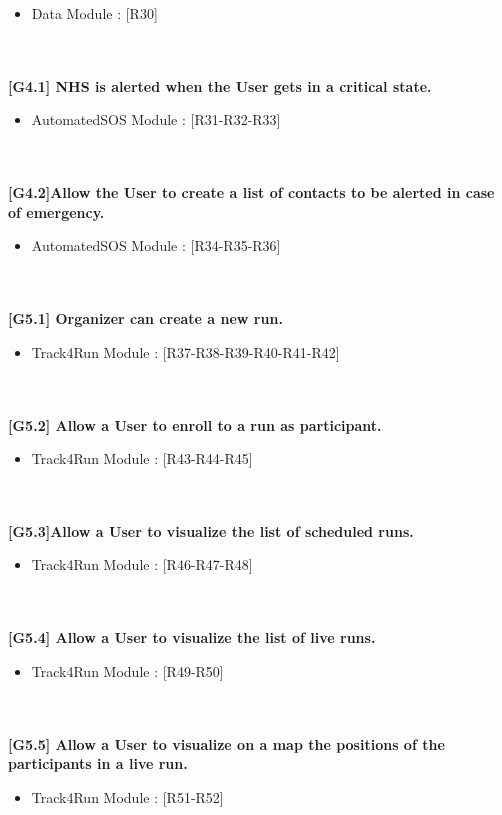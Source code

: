 \begin{itemize}
  \item Data Module : [R30]
\end{itemize} \\ \\
\textbf{[G4.1] NHS is alerted when the User gets in a critical state.}
\begin{itemize}
  \item AutomatedSOS Module : [R31-R32-R33]
\end{itemize} \\ \\
\textbf{[G4.2]Allow the User to create a list of contacts to be alerted in case of
emergency.}
\begin{itemize}
  \item AutomatedSOS Module : [R34-R35-R36]
\end{itemize} \\ \\
\textbf{[G5.1] Organizer can create a new run.}
\begin{itemize}
  \item Track4Run Module : [R37-R38-R39-R40-R41-R42]
\end{itemize} \\ \\
\textbf{[G5.2] Allow a User to enroll to a run as participant.}
\begin{itemize}
  \item Track4Run Module : [R43-R44-R45]
\end{itemize} \\ \\
\textbf{[G5.3]Allow a User to visualize the list of scheduled runs.}
\begin{itemize}
  \item Track4Run Module : [R46-R47-R48]
\end{itemize} \\ \\
\textbf{[G5.4] Allow a User to visualize the list of live runs.}
\begin{itemize}
  \item Track4Run Module : [R49-R50]
\end{itemize} \\ \\
\textbf{[G5.5] Allow a User to visualize on a map the positions of the participants
in a live run.}
\begin{itemize}
  \item Track4Run Module : [R51-R52]
\end{itemize} \\ \\








 

  